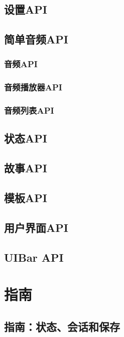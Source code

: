 \documentclass[hyperref,UTF8]{ctexart}
\begin{document}
\newpage
\subsection{设置API}

\newpage
\subsection{简单音频API}

\subsubsection{音频API}

\subsubsection{音频播放器API}

\subsubsection{音频列表API}

\newpage
\subsection{状态API}

\newpage
\subsection{故事API}

\newpage
\subsection{模板API}

\newpage
\subsection{用户界面API}

\newpage
\subsection{UIBar API}

\newpage
\section{指南}
\subsection{指南：状态、会话和保存}
\end{document}
